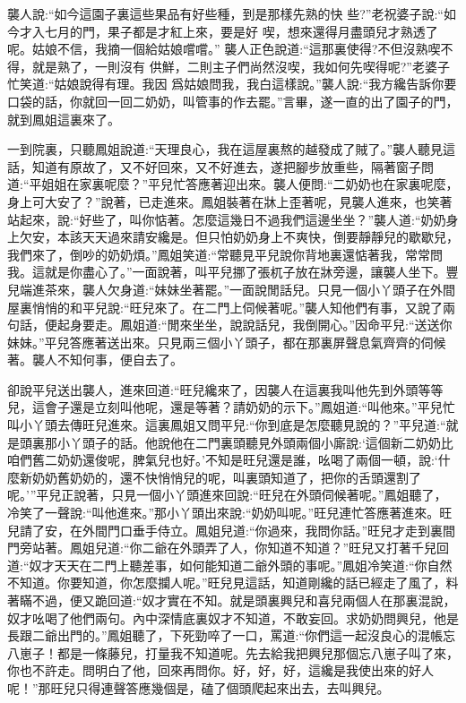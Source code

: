 \begin{parag}
    襲人說:“如今這園子裏這些果品有好些種，到是那樣先熟的快
    些?”老祝婆子說:“如今才入七月的門，果子都是才紅上來，要是好
    喫，想來還得月盡頭兒才熟透了呢。姑娘不信，我摘一個給姑娘嚐嚐。”
    襲人正色說道:“這那裏使得?不但沒熟喫不得，就是熟了，一則沒有
    供鮮，二則主子們尚然沒喫，我如何先喫得呢?”老婆子忙笑道:“姑娘說得有理。我因
    爲姑娘問我，我白這樣說。”襲人說:“我方纔告訴你要口袋的話，你就回一回二奶奶，叫管事的作去罷。”言畢，遂一直的出了園子的門，就到鳳姐這裏來了。
\end{parag}


\begin{parag}
    一到院裏，只聽鳳姐說道:“天理良心，我在這屋裏熬的越發成了賊了。”襲人聽見這話，知道有原故了，又不好回來，又不好進去，遂把腳步放重些，隔著窗子問道:“平姐姐在家裏呢麼？”平兒忙答應著迎出來。襲人便問:“二奶奶也在家裏呢麼，身上可大安了？”說著，已走進來。鳳姐裝著在牀上歪著呢，見襲人進來，也笑著站起來，說:“好些了，叫你惦著。怎麼這幾日不過我們這邊坐坐？”襲人道:“奶奶身上欠安，本該天天過來請安纔是。但只怕奶奶身上不爽快，倒要靜靜兒的歇歇兒，我們來了，倒吵的奶奶煩。”鳳姐笑道:“常聽見平兒說你背地裏還惦著我，常常問我。這就是你盡心了。”一面說著，叫平兒挪了張杌子放在牀旁邊，讓襲人坐下。豐兒端進茶來，襲人欠身道:“妹妹坐著罷。”一面說閒話兒。只見一個小丫頭子在外間屋裏悄悄的和平兒說:“旺兒來了。在二門上伺候著呢。”襲人知他們有事，又說了兩句話，便起身要走。鳳姐道:“閒來坐坐，說說話兒，我倒開心。”因命平兒:“送送你妹妹。”平兒答應著送出來。只見兩三個小丫頭子，都在那裏屏聲息氣齊齊的伺候著。襲人不知何事，便自去了。
\end{parag}


\begin{parag}
    卻說平兒送出襲人，進來回道:“旺兒纔來了，因襲人在這裏我叫他先到外頭等等兒，這會子還是立刻叫他呢，還是等著？請奶奶的示下。”鳳姐道:“叫他來。”平兒忙叫小丫頭去傳旺兒進來。這裏鳳姐又問平兒:“你到底是怎麼聽見說的？”平兒道:“就是頭裏那小丫頭子的話。他說他在二門裏頭聽見外頭兩個小廝說:‘這個新二奶奶比咱們舊二奶奶還俊呢，脾氣兒也好。’不知是旺兒還是誰，吆喝了兩個一頓，說:‘什麼新奶奶舊奶奶的，還不快悄悄兒的呢，叫裏頭知道了，把你的舌頭還割了呢。’”平兒正說著，只見一個小丫頭進來回說:“旺兒在外頭伺候著呢。”鳳姐聽了，冷笑了一聲說:“叫他進來。”那小丫頭出來說:“奶奶叫呢。”旺兒連忙答應著進來。旺兒請了安，在外間門口垂手侍立。鳳姐兒道:“你過來，我問你話。”旺兒才走到裏間門旁站著。鳳姐兒道:“你二爺在外頭弄了人，你知道不知道？”旺兒又打著千兒回道:“奴才天天在二門上聽差事，如何能知道二爺外頭的事呢。”鳳姐冷笑道:“你自然不知道。你要知道，你怎麼攔人呢。”旺兒見這話，知道剛纔的話已經走了風了，料著瞞不過，便又跪回道:“奴才實在不知。就是頭裏興兒和喜兒兩個人在那裏混說，奴才吆喝了他們兩句。內中深情底裏奴才不知道，不敢妄回。求奶奶問興兒，他是長跟二爺出門的。”鳳姐聽了，下死勁啐了一口，罵道:“你們這一起沒良心的混帳忘八崽子！都是一條藤兒，打量我不知道呢。先去給我把興兒那個忘八崽子叫了來，你也不許走。問明白了他，回來再問你。好，好，好，這纔是我使出來的好人呢！”那旺兒只得連聲答應幾個是，磕了個頭爬起來出去，去叫興兒。
\end{parag}


